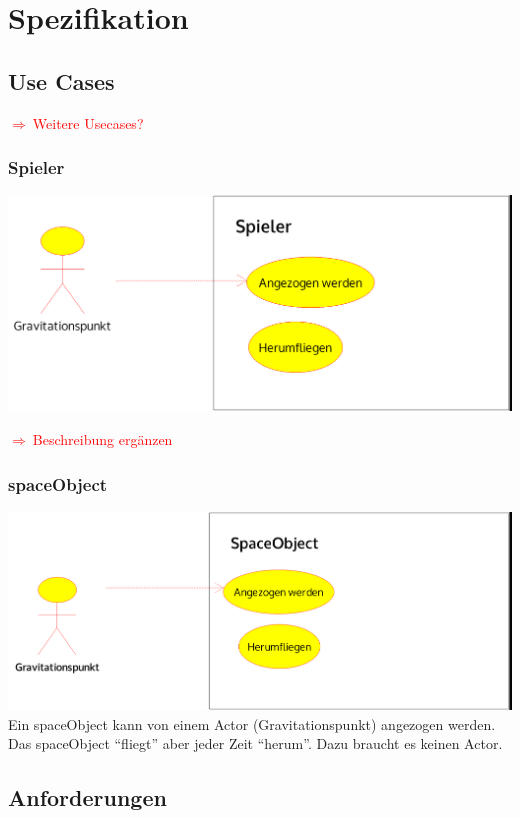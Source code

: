 \documentclass[12pt,a4paper]{scrartcl}
\newcommand{\q}[1]{``#1''}
\newcommand{\todo}[1]{\begin{Large}\textcolor{red}{$\Rightarrow ~$#1}\end{Large}}
\begin{document}
\section{Spezifikation}
\subsection{Use Cases}
\todo{Weitere Usecases?}
\subsubsection{Spieler}
\includegraphics[scale=0.2]{use_cases/spieler.png}
\todo{Beschreibung ergänzen}


\subsubsection{spaceObject}
\includegraphics[scale=0.2]{use_cases/spaceObject.png}\\
Ein spaceObject kann von einem Actor (Gravitationspunkt) angezogen werden. Das spaceObject
\q{fliegt} aber jeder Zeit \q{herum}. Dazu braucht es keinen Actor.


\subsection{Anforderungen} 
\end{document}
